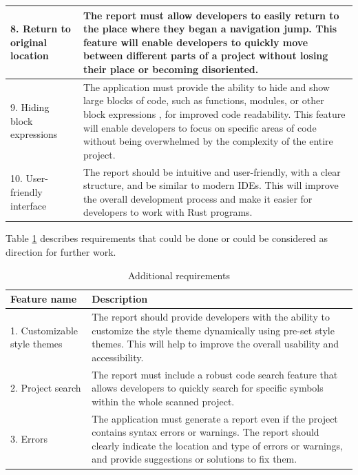 \begin{longtable}{|p{1.5in}|p{4in}|}
8. Return to original location & The report must allow developers to easily return to the place where they began a navigation jump. This feature will enable developers to quickly move between different parts of a project without losing their place or becoming disoriented. \\\hline

9. Hiding block expressions & The application must provide the ability to hide and show large blocks of code, such as functions, modules, or other block expressions \cite{rust-book-code-blocks}, for improved code readability. This feature will enable developers to focus on specific areas of code without being overwhelmed by the complexity of the entire project.\\\hline 

10. User-friendly interface & The report should be intuitive and user-friendly, with a clear structure, and be similar to modern IDEs. This will improve the overall development process and make it easier for developers to work with Rust programs.\\\hline

\end{longtable}

Table \ref{table:could_req} describes requirements that could be done or could be considered as direction for further work.

\begin{longtable}{|p{1.5in}|p{4in}|}
\caption[Additional requirements]{Additional requirements}\label{table:could_req}\\\hline
Feature name & Description\\\hline
1. Customizable style themes & The report should provide developers with the ability to customize the style theme dynamically using pre-set style themes. This will help to improve the overall usability and accessibility. \\\hline

2. Project search & The report must include a robust code search feature that allows developers to quickly search for specific symbols within the whole scanned project.\\\hline

3. Errors & The application must generate a report even if the project contains syntax errors or warnings. The report should clearly indicate the location and type of errors or warnings, and provide suggestions or solutions to fix them. \\\hline

\end{longtable}



